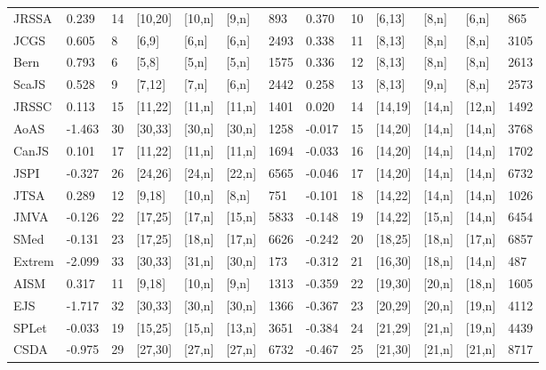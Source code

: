 \begin{longtable}[]{@{}lllllllllllll@{}}
JRSSA & 0.239 & 14 & {[}10,20{]} & {[}10,n{]} & {[}9,n{]} & 893 & 0.370
& 10 & {[}6,13{]} & {[}8,n{]} & {[}6,n{]} & 865 \\
JCGS & 0.605 & 8 & {[}6,9{]} & {[}6,n{]} & {[}6,n{]} & 2493 & 0.338 & 11
& {[}8,13{]} & {[}8,n{]} & {[}8,n{]} & 3105 \\
Bern & 0.793 & 6 & {[}5,8{]} & {[}5,n{]} & {[}5,n{]} & 1575 & 0.336 & 12
& {[}8,13{]} & {[}8,n{]} & {[}8,n{]} & 2613 \\
ScaJS & 0.528 & 9 & {[}7,12{]} & {[}7,n{]} & {[}6,n{]} & 2442 & 0.258 &
13 & {[}8,13{]} & {[}9,n{]} & {[}8,n{]} & 2573 \\
JRSSC & 0.113 & 15 & {[}11,22{]} & {[}11,n{]} & {[}11,n{]} & 1401 &
0.020 & 14 & {[}14,19{]} & {[}14,n{]} & {[}12,n{]} & 1492 \\
AoAS & -1.463 & 30 & {[}30,33{]} & {[}30,n{]} & {[}30,n{]} & 1258 &
-0.017 & 15 & {[}14,20{]} & {[}14,n{]} & {[}14,n{]} & 3768 \\
CanJS & 0.101 & 17 & {[}11,22{]} & {[}11,n{]} & {[}11,n{]} & 1694 &
-0.033 & 16 & {[}14,20{]} & {[}14,n{]} & {[}14,n{]} & 1702 \\
JSPI & -0.327 & 26 & {[}24,26{]} & {[}24,n{]} & {[}22,n{]} & 6565 &
-0.046 & 17 & {[}14,20{]} & {[}14,n{]} & {[}14,n{]} & 6732 \\
JTSA & 0.289 & 12 & {[}9,18{]} & {[}10,n{]} & {[}8,n{]} & 751 & -0.101 &
18 & {[}14,22{]} & {[}14,n{]} & {[}14,n{]} & 1026 \\
JMVA & -0.126 & 22 & {[}17,25{]} & {[}17,n{]} & {[}15,n{]} & 5833 &
-0.148 & 19 & {[}14,22{]} & {[}15,n{]} & {[}14,n{]} & 6454 \\
SMed & -0.131 & 23 & {[}17,25{]} & {[}18,n{]} & {[}17,n{]} & 6626 &
-0.242 & 20 & {[}18,25{]} & {[}18,n{]} & {[}17,n{]} & 6857 \\
Extrem & -2.099 & 33 & {[}30,33{]} & {[}31,n{]} & {[}30,n{]} & 173 &
-0.312 & 21 & {[}16,30{]} & {[}18,n{]} & {[}14,n{]} & 487 \\
AISM & 0.317 & 11 & {[}9,18{]} & {[}10,n{]} & {[}9,n{]} & 1313 & -0.359
& 22 & {[}19,30{]} & {[}20,n{]} & {[}18,n{]} & 1605 \\
EJS & -1.717 & 32 & {[}30,33{]} & {[}30,n{]} & {[}30,n{]} & 1366 &
-0.367 & 23 & {[}20,29{]} & {[}20,n{]} & {[}19,n{]} & 4112 \\
SPLet & -0.033 & 19 & {[}15,25{]} & {[}15,n{]} & {[}13,n{]} & 3651 &
-0.384 & 24 & {[}21,29{]} & {[}21,n{]} & {[}19,n{]} & 4439 \\
CSDA & -0.975 & 29 & {[}27,30{]} & {[}27,n{]} & {[}27,n{]} & 6732 &
-0.467 & 25 & {[}21,30{]} & {[}21,n{]} & {[}21,n{]} & 8717 \\

\end{longtable}
